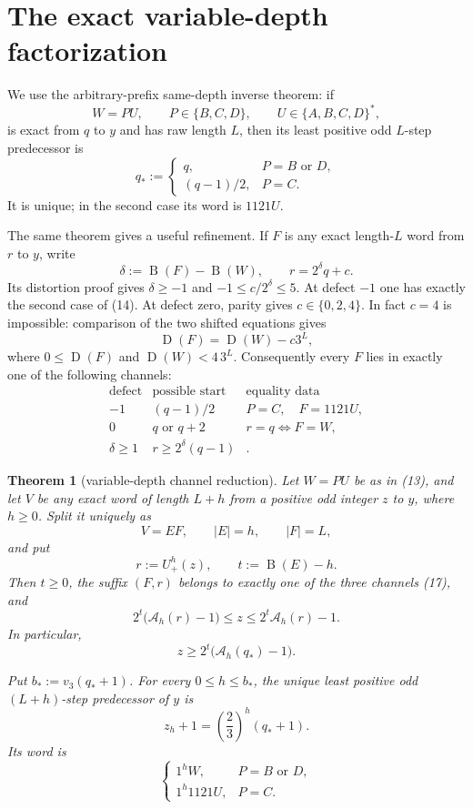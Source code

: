 \documentclass[11pt]{article}
\newtheorem{theorem}{Theorem}
\newcommand{\Up}{U_+}
\newcommand{\mass}{\operatorname{B}}
\newcommand{\sh}{\operatorname{D}}
\begin{document}
\section{The exact variable-depth factorization}

We use the arbitrary-prefix same-depth inverse theorem: if
\[
 W=PU,\qquad P\in\{B,C,D\},\qquad U\in\{A,B,C,D\}^*,
 \tag{13}
\]
is exact from $q$ to $y$ and has raw length $L$, then its least positive
odd $L$-step predecessor is
\[
 q_*:=\begin{cases}
 q,&P=B\text{ or }D,\\[1mm]
 (q-1)/2,&P=C.
 \end{cases}
 \tag{14}
\]
It is unique; in the second case its word is $1121U$.

The same theorem gives a useful refinement.  If $F$ is any exact
length-$L$ word from $r$ to $y$, write
\[
 \delta:=\mass(F)-\mass(W),
 \qquad r=2^\delta q+c.
 \tag{15}
\]
Its distortion proof gives $\delta\geq-1$ and
$-1\leq c/2^\delta\leq5$.  At defect $-1$ one has exactly the second
case of (14).  At defect zero, parity gives $c\in\{0,2,4\}$.  In fact
$c=4$ is impossible: comparison of the two shifted equations gives
\[
 \sh(F)=\sh(W)-c3^L,
 \tag{16}
\]
where $0\leq\sh(F)$ and $\sh(W)<4\,3^L$.  Consequently every $F$ lies
in exactly one of the following channels:
\[
\begin{array}{c|c|c}
\text{defect}&\text{possible start}&\text{equality data}\\ \hline
-1&(q-1)/2&P=C,\quad F=1121U,\\
0&q\text{ or }q+2&r=q\Longleftrightarrow F=W,\\
\delta\geq1&r\geq2^\delta(q-1)&{}.
\end{array}
\tag{17}
\]

\begin{theorem}[variable-depth channel reduction]
Let $W=PU$ be as in (13), and let $V$ be any exact word of length
$L+h$ from a positive odd integer $z$ to $y$, where $h\geq0$.
Split it uniquely as
\[
 V=EF,
 \qquad |E|=h,
 \qquad |F|=L,
 \tag{18}
\]
and put
\[
 r:=\Up^h(z),
 \qquad t:=\mass(E)-h.
 \tag{19}
\]
Then $t\geq0$, the suffix $(F,r)$ belongs to exactly one of the three
channels (17), and
\[
 \boxed{
  2^t\bigl(\mathcal A_h(r)-1\bigr)
  \leq z\leq2^t\mathcal A_h(r)-1.}
 \tag{20}
\]
In particular,
\[
 \boxed{
 z\geq2^t\bigl(\mathcal A_h(q_*)-1\bigr).}
 \tag{21}
\]

Put $b_*:=v_3(q_*+1)$.  For every $0\leq h\leq b_*$, the unique least
positive odd $(L+h)$-step predecessor of $y$ is
\[
 \boxed{
 z_h+1=\left(\frac23\right)^h(q_*+1).}
 \tag{22}
\]
Its word is
\[
 \boxed{
 \begin{cases}
 1^hW,&P=B\text{ or }D,\\
 1^h1121U,&P=C.
 \end{cases}}
 \tag{23}
\]
\end{theorem}
\end{document}
